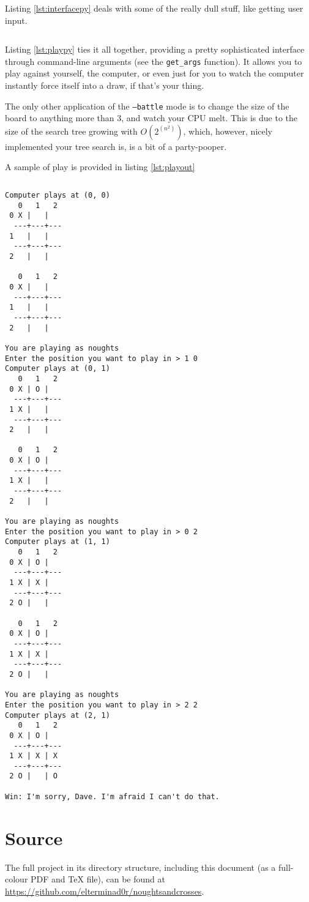 \documentclass[a4paper,11pt]{article}
\newenvironment{longlisting}
{\addvspace{\baselineskip}\captionsetup{type=listing}}
{\addvspace{\baselineskip}}
\begin{document}
    Listing \ref{lst:interfacepy} deals with some of the really dull stuff, like
    getting user input.

\begin{longlisting}
\inputminted{python}{../src/interface.py}
\caption{\texttt{interface.py}: Dealing with user input}
\label{lst:interfacepy}
\end{longlisting}

    Listing \ref{lst:playpy} ties it all together, providing a pretty sophisticated
    interface through command-line arguments (see the \texttt{get\_args}
    function). It allows you to play against yourself, the computer, or even
    just for you to watch the computer instantly force itself into a draw, if
    that's your thing.

    The only other application of the \texttt{--battle} mode is to change the
    size of the board to anything more than 3, and watch your CPU melt. This is
    due to the size of the search tree growing with $O(2^{(n^2)})$, which,
    however, nicely implemented your tree search is, is a bit of a party-pooper.

    A sample of play is provided in listing \ref{lst:playout}

\begin{longlisting}
\inputminted{python}{../src/play.py}
\caption{\texttt{play.py}: Bringing it all together to play the game}
\label{lst:playpy}
\end{longlisting}

\begin{longlisting}
\begin{verbatim}
Computer plays at (0, 0)
   0   1   2
 0 X |   |   
  ---+---+---
 1   |   |   
  ---+---+---
 2   |   |   

   0   1   2
 0 X |   |   
  ---+---+---
 1   |   |   
  ---+---+---
 2   |   |   

You are playing as noughts
Enter the position you want to play in > 1 0
Computer plays at (0, 1)
   0   1   2
 0 X | O |   
  ---+---+---
 1 X |   |   
  ---+---+---
 2   |   |   

   0   1   2
 0 X | O |   
  ---+---+---
 1 X |   |   
  ---+---+---
 2   |   |   

You are playing as noughts
Enter the position you want to play in > 0 2
Computer plays at (1, 1)
   0   1   2
 0 X | O |   
  ---+---+---
 1 X | X |   
  ---+---+---
 2 O |   |   

   0   1   2
 0 X | O |   
  ---+---+---
 1 X | X |   
  ---+---+---
 2 O |   |   

You are playing as noughts
Enter the position you want to play in > 2 2
Computer plays at (2, 1)
   0   1   2
 0 X | O |   
  ---+---+---
 1 X | X | X 
  ---+---+---
 2 O |   | O 

Win: I'm sorry, Dave. I'm afraid I can't do that.
\end{verbatim}
\caption{Output of \texttt{play.py}}\label{lst:playout}
\end{longlisting}

    \section{Source}

    The full project in its directory structure, including this document (as a
    full-colour PDF and \TeX{} file), can be found at
    \url{https://github.com/elterminad0r/noughtsandcrosses}.
\end{document}
